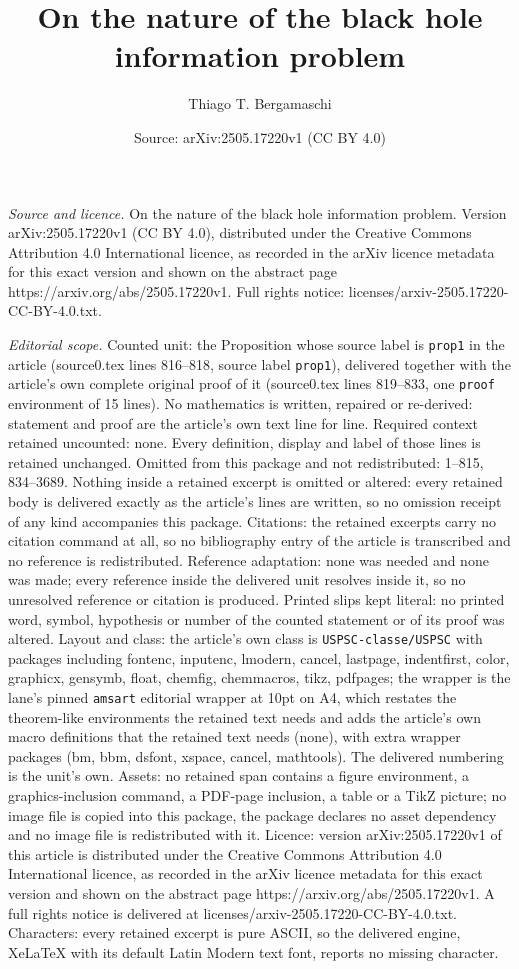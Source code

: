 \documentclass[10pt,a4paper]{amsart}
\title[On the nature of the black hole information problem]{On the nature of the black hole information problem}
\author{Thiago T. Bergamaschi}
\date{Source: arXiv:2505.17220v1 (CC BY 4.0)}
\begin{document}
\maketitle

\noindent\emph{Source and licence.} On the nature of the black hole information problem. Version arXiv:2505.17220v1 (CC BY 4.0), distributed under the Creative Commons Attribution 4.0 International licence, as recorded in the arXiv licence metadata for this exact version and shown on the abstract page https://arxiv.org/abs/2505.17220v1. Full rights notice: licenses/arxiv-2505.17220-CC-BY-4.0.txt.\par\smallskip

\noindent\textit{Editorial scope.} Counted unit: the Proposition whose source label is \texttt{prop1} in the article (source0.tex lines 816--818, source label \texttt{prop1}), delivered together with the article's own complete original proof of it (source0.tex lines 819--833, one \texttt{proof} environment of 15 lines). No mathematics is written, repaired or re-derived: statement and proof are the article's own text line for line. Required context retained uncounted: none. Every definition, display and label of those lines is retained unchanged. Omitted from this package and not redistributed: 1--815, 834--3689. Nothing inside a retained excerpt is omitted or altered: every retained body is delivered exactly as the article's lines are written, so no omission receipt of any kind accompanies this package. Citations: the retained excerpts carry no citation command at all, so no bibliography entry of the article is transcribed and no reference is redistributed. Reference adaptation: none was needed and none was made; every reference inside the delivered unit resolves inside it, so no unresolved reference or citation is produced. Printed slips kept literal: no printed word, symbol, hypothesis or number of the counted statement or of its proof was altered. Layout and class: the article's own class is \texttt{USPSC-classe/USPSC} with packages including fontenc, inputenc, lmodern, cancel, lastpage, indentfirst, color, graphicx, gensymb, float, chemfig, chemmacros, tikz, pdfpages; the wrapper is the lane's pinned \texttt{amsart} editorial wrapper at 10pt on A4, which restates the theorem-like environments the retained text needs and adds the article's own macro definitions that the retained text needs (none), with extra wrapper packages (bm, bbm, dsfont, xspace, cancel, mathtools). The delivered numbering is the unit's own. Assets: no retained span contains a figure environment, a graphics-inclusion command, a PDF-page inclusion, a table or a TikZ picture; no image file is copied into this package, the package declares no asset dependency and no image file is redistributed with it. Licence: version arXiv:2505.17220v1 of this article is distributed under the Creative Commons Attribution 4.0 International licence, as recorded in the arXiv licence metadata for this exact version and shown on the abstract page https://arxiv.org/abs/2505.17220v1. A full rights notice is delivered at licenses/arxiv-2505.17220-CC-BY-4.0.txt. Characters: every retained excerpt is pure ASCII, so the delivered engine, XeLaTeX with its default Latin Modern text font, reports no missing character.
\end{document}
